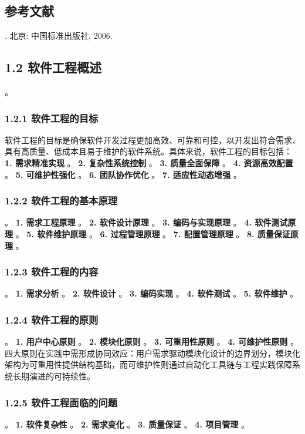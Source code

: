 \subsection{参考文献}\label{ux53c2ux8003ux6587ux732e} . 北京: 中国标准出版社, 2006. \subsection{1.2
软件工程概述}\label{ux8f6fux4ef6ux5de5ux7a0bux6982ux8ff0} 。 \subsubsection{1.2.1
软件工程的目标}\label{ux8f6fux4ef6ux5de5ux7a0bux7684ux76eeux6807}
软件工程的目标是确保软件开发过程更加高效、可靠和可控，以开发出符合需求、具有高质量、低成本且易于维护的软件系统。具体来说，软件工程的目标包括： \textbf{1. 需求精准实现} 。 \textbf{2. 复杂性系统控制} 。
\textbf{3. 质量全面保障} 。 \textbf{4. 资源高效配置} 。 \textbf{5. 可维护性强化} 。 \textbf{6. 团队协作优化} 。 \textbf{7. 适应性动态增强} 。
\subsubsection{1.2.2 软件工程的基本原理}\label{ux8f6fux4ef6ux5de5ux7a0bux7684ux57faux672cux539fux7406} 。 \textbf{1. 需求工程原理} 。
\textbf{2. 软件设计原理} 。 \textbf{3. 编码与实现原理} 。 \textbf{4. 软件测试原理} 。 \textbf{5. 软件维护原理} 。 \textbf{6. 过程管理原理} 。 \textbf{7.
配置管理原理} 。 \textbf{8. 质量保证原理} 。 \subsubsection{1.2.3 软件工程的内容}\label{ux8f6fux4ef6ux5de5ux7a0bux7684ux5185ux5bb9} 。
\textbf{1. 需求分析} 。 \textbf{2. 软件设计} 。 \textbf{3. 编码实现} 。 \textbf{4. 软件测试} 。 \textbf{5. 软件维护} 。 \subsubsection{1.2.4
软件工程的原则}\label{ux8f6fux4ef6ux5de5ux7a0bux7684ux539fux5219} 。 \textbf{1. 用户中心原则} 。 \textbf{2. 模块化原则} 。 \textbf{3. 可重用性原则}
。 \textbf{4. 可维护性原则} 。 四大原则在实践中需形成协同效应：用户需求驱动模块化设计的边界划分，模块化架构为可重用性提供结构基础，而可维护性则通过自动化工具链与工程实践保障系统长期演进的可持续性。
\subsubsection{1.2.5 软件工程面临的问题}\label{ux8f6fux4ef6ux5de5ux7a0bux9762ux4e34ux7684ux95eeux9898} 。 \textbf{1. 软件复杂性} 。
\textbf{2. 需求变化} 。 \textbf{3. 质量保证} 。 \textbf{4. 项目管理} 。
